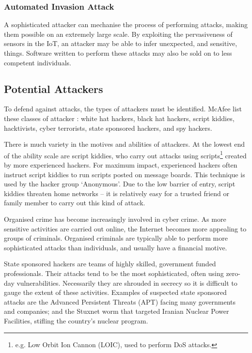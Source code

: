 \documentclass[10pt,journal,compsoc]{IEEEtran}
\begin{document}
\subsubsection{Automated Invasion Attack}
A sophisticated attacker can mechanise the process of performing attacks,
making them possible on an extremely large scale. By exploiting the
pervasiveness of sensors in the IoT, an attacker may be able to infer
unexpected, and sensitive, things. Software written to perform these attacks
may also be sold on to less competent individuals. 

\subsection{Potential Attackers}
To defend against attacks, the types of attackers must be identified. McAfee
list these classes of attacker \cite{McAfee2011}: white hat hackers, black hat
hackers, script kiddies, hacktivists, cyber terrorists, state sponsored
hackers, and spy hackers. 

There is much variety in the motives and abilities of attackers. At
the lowest end of the ability scale are script kiddies, who carry out attacks
using scripts\footnote{e.g. Low Orbit Ion Cannon (LOIC), used to perform DoS
attacks.} created by more experienced hackers. For maximum impact, experienced
hackers often instruct script kiddies to run scripts posted on message boards.
This technique is used by the hacker group `Anonymous'. Due to the low barrier
of entry, script kiddies threaten home networks -- it is relatively easy for a
trusted friend or family member to carry out this kind of attack. 

Organised crime has become increasingly involved in cyber crime. As more
sensitive activities are carried out online, the Internet becomes more
appealing to groups of criminals. Organised criminals are typically able to
perform more sophisticated attacks than individuals, and usually have a
financial motive. 

State sponsored hackers are teams of highly skilled, government funded
professionals. Their attacks tend to be the most sophisticated, often using
zero-day vulnerabilities. Necessarily they are shrouded in secrecy so it is
difficult to gauge the extent of these activities. Examples of suspected state
sponsored attacks are the Advanced Persistent Threats (APT) facing many
governments and companies; and the Stuxnet worm that targeted Iranian Nuclear
Power Facilities, stifling the country's nuclear program.  
\end{document}
